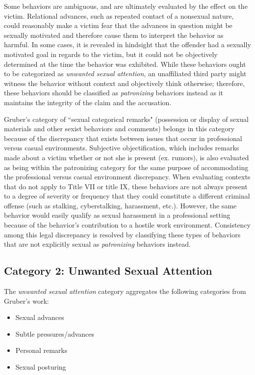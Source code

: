 Some behaviors are ambiguous, and are ultimately evaluated by the effect on the victim. Relational advances, such as repeated contact of a nonsexual nature, could reasonably make a victim fear that the advances in question might be sexually motivated and therefore cause them to interpret the behavior as harmful. In some cases, it is revealed in hindsight that the offender had a sexually motivated goal in regards to the victim, but it could not be objectively determined at the time the behavior was exhibited. While these behaviors ought to be categorized as \textit{unwanted sexual attention}, an unaffiliated third party might witness the behavior without context and objectively think otherwise; therefore, these behaviors should be classified as \textit{patronizing} behaviors instead as it maintains the integrity of the claim and the accusation.

Gruber's category of ``sexual categorical remarks" (possession or display of sexual materials and other sexist behaviors and comments) belongs in this category because of the discrepancy that exists between issues that occur in professional versus casual environments. Subjective objectification, which includes remarks made about a victim whether or not she is present (ex. rumors), is also evaluated as being within the patronizing category for the same purpose of accommodating the professional versus casual environment discrepancy. When evaluating contexts that do not apply to Title VII or title IX, these behaviors are not always present to a degree of severity or frequency that they could constitute a different criminal offense (such as stalking, cyberstalking, harassment, etc.). However, the same behavior would easily qualify as sexual harassment in a professional setting because of the behavior's contribution to a hostile work environment. Consistency among this legal discrepancy is resolved by classifying these types of behaviors that are not explicitly sexual as \textit{patronizing} behaviors instead.

\subsection{Category 2: Unwanted Sexual Attention}

The \textit{unwanted sexual attention} category aggregates the following categories from Gruber's work:

\begin{itemize}
    \item Sexual advances
    \item Subtle pressures/advances
    \item Personal remarks
    \item Sexual posturing
\end{itemize}

